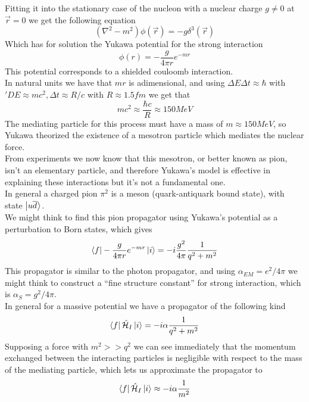 \documentclass[../qm.tex]{subfiles}
\begin{document}
Fitting it into the stationary case of the nucleon with a nuclear charge $g\ne0$ at $\vec{r}=0$ we get the following equation
\begin{equation}
	\left( \nabla^2-m^2 \right)\phi(\vec{r})=-g\delta^3(\vec{r})
	\label{eq:yukawapoteq}
\end{equation}
Which has for solution the Yukawa potential for the strong interaction
\begin{equation}
	\phi(r)=-\frac{g}{4\pi r}e^{-mr}
	\label{eq:yukawapot}
\end{equation}
This potential corresponds to a shielded couloomb interaction.\\
In natural units we have that $mr$ is adimensional, and using $\Delta E\Delta t\approx\hbar$ with $'D E\approx mc^2,\Delta t\approx R/c$ with $R\approx1.5\unit{fm}$ we get that
\begin{equation*}
	mc^2\approx\frac{\hbar c}{R}\approx150\unit{MeV}
\end{equation*}
The mediating particle for this process must have a mass of $m\approx150\unit{MeV}$, so Yukawa theorized the existence of a mesotron particle which mediates the nuclear force.\\
From experiments we now know that this mesotron, or better known as pion, isn't an elementary particle, and therefore Yukawa's model is effective in explaining these interactions but it's not a fundamental one.\\
In general a charged pion $\pi^2$ is a meson (quark-antiquark bound state), with state $\ket{u\overline{d}}$.\\
We might think to find this pion propagator using Yukawa's potential as a perturbation to Born states, which gives
\begin{equation}
	\bra{f}-\frac{g}{4\pi r}e^{-mr}\ket{i}=-i\frac{g^2}{4\pi}\frac{1}{q^2+m^2}
	\label{eq:pionpropagator}
\end{equation}
This propagator is similar to the photon propagator, and using $\alpha_{EM}=e^2/4\pi$ we might think to construct a ``fine structure constant'' for strong interaction, which is $\alpha_S=g^2/4\pi$.\\
In general for a massive potential we have a propagator of the following kind
\begin{equation}
	\bra{f}\hat{\mathcal{H}}_I\ket{i}=-i\alpha\frac{1}{q^2+m^2}
	\label{eq:massivepropagator}
\end{equation}
Supposing a force with $m^2>>q^2$ we can see immediately that the momentum exchanged between the interacting particles is negligible with respect to the mass of the mediating particle, which lets us approximate the propagator to
\begin{equation}
	\bra{f}\hat{\mathcal{H}}_I\ket{i}\approx-i\alpha\frac{1}{m^2}
	\label{eq:propagatormassiveapprox}
\end{equation}
\end{document}
